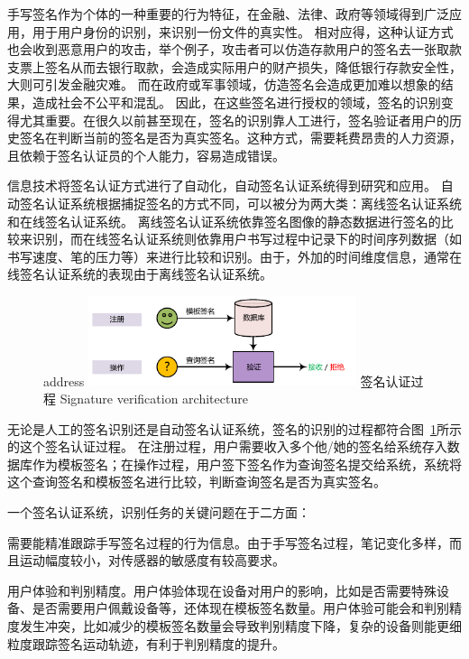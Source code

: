 手写签名作为个体的一种重要的行为特征，在金融、法律、政府等领域得到广泛应用，用于用户身份的识别，来识别一份文件的真实性。 相对应得，这种认证方式也会收到恶意用户的攻击，举个例子，攻击者可以仿造存款用户的签名去一张取款支票上签名从而去银行取款，会造成实际用户的财产损失，降低银行存款安全性，大则可引发金融灾难。 而在政府或军事领域，仿造签名会造成更加难以想象的结果，造成社会不公平和混乱。 因此，在这些签名进行授权的领域，签名的识别变得尤其重要。在很久以前甚至现在，签名的识别靠人工进行，签名验证者用户的历史签名在判断当前的签名是否为真实签名。这种方式，需要耗费昂贵的人力资源，且依赖于签名认证员的个人能力，容易造成错误。

信息技术将签名认证方式进行了自动化，自动签名认证系统得到研究和应用。 自动签名认证系统根据捕捉签名的方式不同，可以被分为两大类：离线签名认证系统和在线签名认证系统。 离线签名认证系统依靠签名图像的静态数据进行签名的比较来识别，而在线签名认证系统则依靠用户书写过程中记录下的时间序列数据（如书写速度、笔的压力等）来进行比较和识别。由于，外加的时间维度信息，通常在线签名认证系统的表现由于离线签名认证系统。

\begin{figure}[!htp]address
  \centering
  \includegraphics[width=0.7\textwidth]{figure/verification-work-flow.pdf}
  \bicaption
    {签名认证过程}
    {Signature verification architecture}
  \label{fig:signature-verification-architecture}
\end{figure}

无论是人工的签名识别还是自动签名认证系统，签名的识别的过程都符合图~\ref{fig:signature-verification-architecture}所示的这个签名认证过程。 在注册过程，用户需要收入多个他/她的签名给系统存入数据库作为模板签名；在操作过程，用户签下签名作为查询签名提交给系统，系统将这个查询签名和模板签名进行比较，判断查询签名是否为真实签名。

一个签名认证系统，识别任务的关键问题在于二方面：
\begin{enumerate*}[label=\itshape\alph*)\upshape]
    \item 需要能精准跟踪手写签名过程的行为信息。由于手写签名过程，笔记变化多样，而且运动幅度较小，对传感器的敏感度有较高要求。
    \item 用户体验和判别精度。用户体验体现在设备对用户的影响，比如是否需要特殊设备、是否需要用户佩戴设备等，还体现在模板签名数量。用户体验可能会和判别精度发生冲突，比如减少的模板签名数量会导致判别精度下降，复杂的设备则能更细粒度跟踪签名运动轨迹，有利于判别精度的提升。
\end{enumerate*}

